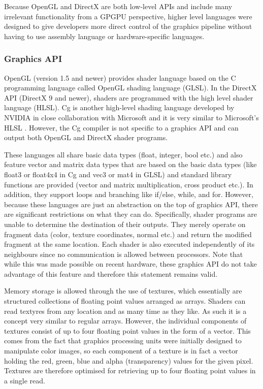 Because OpenGL and DirectX are both low-level APIs and include many irrelevant functionality from a GPGPU perspective, higher level languages were designed to give developers more direct control of the graphics pipeline without having to use assembly language or hardware-specific languages. 
	
		\subsubsection*{Graphics API}
OpenGL (version 1.5 and newer) provides shader language based on the C programming language called OpenGL shading language (GLSL). In the DirectX API (DirectX 9 and newer), shaders are programmed with the high level shader language (HLSL). Cg is another high-level shading language developed by NVIDIA in close collaboration with Microsoft and it is very similar to Microsoft's HLSL \citep{Mark03}. However, the Cg compiler is not specific to a graphics API and can output both OpenGL and DirectX shader programs. 

These languages all share basic data types (float, integer, bool etc.) and also feature vector and matrix data types that are based on the basic data types (like float3 or float4x4 in Cg and vec3 or mat4 in GLSL) and standard library functions are provided (vector and matrix multiplication, cross product etc.). In addition, they support loops and branching like if/else, while, and for. However, because these languages are just an abstraction on the top of graphics API, there are significant restrictions on what they can do. Specifically, shader programs are unable to determine the destination of their outputs. They merely operate on fragment data (color, texture coordinates, normal etc.) and return the modified fragment at the same location. Each shader is also executed independently of its neighbours since no communication is allowed between processors. Note that while this was made possible on recent hardware, these graphics API do not take advantage of this feature and therefore this statement remains valid. 

Memory storage is allowed through the use of textures, which essentially are structured collections of floating point values arranged as arrays. Shaders can read textyres from any location and as many time as they like. As such it is a concept very similar to regular arrays. However, the individual components of textures consist of up to four floating point values in the form of a vector. This comes from the fact that graphics processing units were initially designed to manipulate color images, so each component of a texture is in fact a vector holding the red, green, blue and alpha (transparency) values for the given pixel. Textures are therefore optimised for retrieving up to four floating point values in a single read. 

